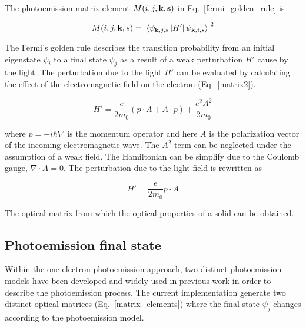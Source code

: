 \documentclass[a4paper,11pt,twoside]{book}
\begin{document}
The photoemission matrix element $M(i,j,\bf{k},s)$ in Eq.~\ref{fermi_golden_rule} is

\begin{equation}
M(i,j,{\bf{k}},s) = \left | \left \langle \psi_{{\bf{k}},j,s}\left | H'  \right | \psi_{{\bf{k}},i,s} \right \rangle \right |^2 
    \label{matrix_elements}
\end{equation}

The Fermi's golden rule describes the transition probability from an initial eigenstate $\psi_i$ to a final state $\psi_j$ as a result of a weak perturbation $H'$ cause by the light. The perturbation due to the light $H'$ can be evaluated by calculating the effect of the electromagnetic field on the electron (Eq.~\ref{matrix2}).

\begin{equation}
H' = \frac{e}{2m_{0}} (p \cdot A + A \cdot p) + \frac{e^2 A^2}{2 m_0}
\label{matrix2}
\end{equation}

where $p = - i \hbar \nabla $ is the momentum operator and here $A$ is the polarization vector of the incoming electromagnetic wave. The $A^2$ term can be neglected under the assumption of a weak field. The Hamiltonian can be simplify due to the Coulomb gauge, $\nabla \cdot A = 0$. The perturbation due to the light field is rewritten as 

\begin{equation}
H' = \frac{e}{2m_{0}} p \cdot A
\label{matrix3}
\end{equation}

The optical matrix from which the optical properties of a solid can be obtained.

\subsection{Photoemission final state}

Within the one-electron photoemission approach, two distinct photoemission models have been developed and widely used in previous work in order to describe the photoemission process. The current implementation generate two distinct optical matrices (Eq.~\ref{matrix_elements}) where the final state $\psi_j$ changes according to the photoemission model.
\end{document}
